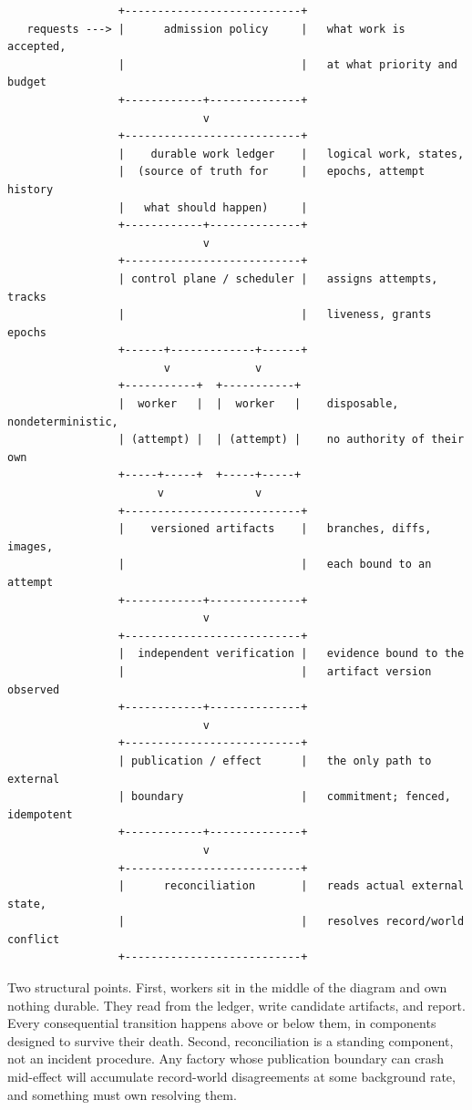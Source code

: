 \begin{verbatim}
                 +---------------------------+
   requests ---> |      admission policy     |   what work is accepted,
                 |                           |   at what priority and budget
                 +------------+--------------+
                              v
                 +---------------------------+
                 |    durable work ledger    |   logical work, states,
                 |  (source of truth for     |   epochs, attempt history
                 |   what should happen)     |
                 +------------+--------------+
                              v
                 +---------------------------+
                 | control plane / scheduler |   assigns attempts, tracks
                 |                           |   liveness, grants epochs
                 +------+-------------+------+
                        v             v
                 +-----------+  +-----------+
                 |  worker   |  |  worker   |    disposable, nondeterministic,
                 | (attempt) |  | (attempt) |    no authority of their own
                 +-----+-----+  +-----+-----+
                       v              v
                 +---------------------------+
                 |    versioned artifacts    |   branches, diffs, images,
                 |                           |   each bound to an attempt
                 +------------+--------------+
                              v
                 +---------------------------+
                 |  independent verification |   evidence bound to the
                 |                           |   artifact version observed
                 +------------+--------------+
                              v
                 +---------------------------+
                 | publication / effect      |   the only path to external
                 | boundary                  |   commitment; fenced, idempotent
                 +------------+--------------+
                              v
                 +---------------------------+
                 |      reconciliation       |   reads actual external state,
                 |                           |   resolves record/world conflict
                 +---------------------------+
\end{verbatim}

Two structural points. First, workers sit in the middle of the diagram and own nothing durable. They read from the ledger, write candidate artifacts, and report. Every consequential transition happens above or below them, in components designed to survive their death. Second, reconciliation is a standing component, not an incident procedure. Any factory whose publication boundary can crash mid-effect will accumulate record-world disagreements at some background rate, and something must own resolving them.

